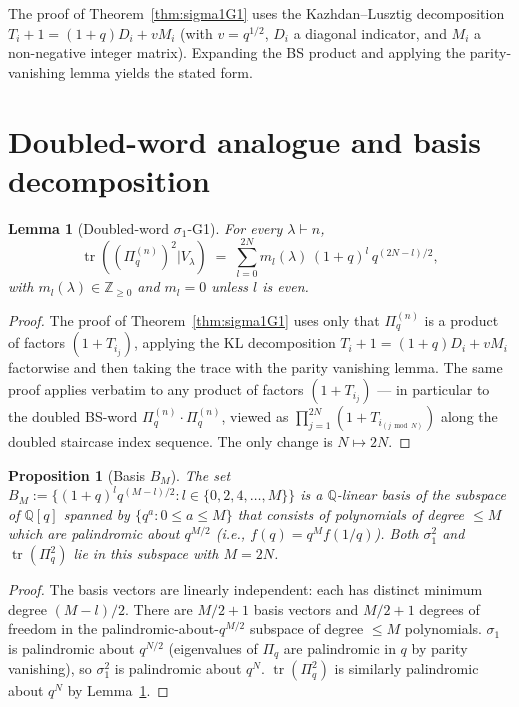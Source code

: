 \documentclass{article}
\newtheorem{lemma}[theorem]{Lemma}
\newtheorem{proposition}[theorem]{Proposition}
\theoremstyle{definition}
\begin{document}
The proof of Theorem~\ref{thm:sigma1G1} uses the Kazhdan--Lusztig decomposition
$T_i + 1 = (1+q)D_i + vM_i$ (with $v = q^{1/2}$, $D_i$ a diagonal indicator,
and $M_i$ a non-negative integer matrix). Expanding the BS product and applying
the parity-vanishing lemma yields the stated form.

\section{Doubled-word analogue and basis decomposition}

\begin{lemma}[Doubled-word $\sigma_1$-G1]\label{lem:doubled}
For every $\lambda \vdash n$,
\[
  \operatorname{tr}((\Pi_q^{(n)})^2 | V_\lambda) \;=\; \sum_{l=0}^{2N} m_l(\lambda)\,(1+q)^l\, q^{(2N-l)/2},
\]
with $m_l(\lambda) \in \mathbb{Z}_{\geq 0}$ and $m_l = 0$ unless $l$ is even.
\end{lemma}

\begin{proof}
The proof of Theorem~\ref{thm:sigma1G1} uses only that $\Pi_q^{(n)}$ is a product of
factors $(1+T_{i_j})$, applying the KL decomposition $T_i+1 = (1+q)D_i + vM_i$
factorwise and then taking the trace with the parity vanishing lemma.
The same proof applies verbatim to any product of factors $(1+T_{i_j})$ — in
particular to the doubled BS-word $\Pi_q^{(n)} \cdot \Pi_q^{(n)}$, viewed as
$\prod_{j=1}^{2N}(1+T_{i_{(j \bmod N)}})$ along the doubled staircase index sequence.
The only change is $N \mapsto 2N$.
\end{proof}

\begin{proposition}[Basis $B_M$]\label{prop:basis}
The set $B_M := \{(1+q)^l q^{(M-l)/2} : l \in \{0, 2, 4, \dots, M\}\}$ is a
$\mathbb{Q}$-linear basis of the subspace of $\mathbb{Q}[q]$ spanned by
$\{q^a : 0 \leq a \leq M\}$ that consists of polynomials of degree $\leq M$
which are palindromic about $q^{M/2}$ (i.e., $f(q) = q^M f(1/q)$). Both
$\sigma_1^2$ and $\operatorname{tr}(\Pi_q^2)$ lie in this subspace with $M = 2N$.
\end{proposition}

\begin{proof}
The basis vectors are linearly independent: each has distinct minimum degree
$(M-l)/2$. There are $M/2 + 1$ basis vectors and $M/2 + 1$ degrees of freedom
in the palindromic-about-$q^{M/2}$ subspace of degree $\leq M$ polynomials.
$\sigma_1$ is palindromic about $q^{N/2}$ (eigenvalues of $\Pi_q$ are palindromic
in $q$ by parity vanishing), so $\sigma_1^2$ is palindromic about $q^N$.
$\operatorname{tr}(\Pi_q^2)$ is similarly palindromic about $q^N$ by Lemma~\ref{lem:doubled}.
\end{proof}
\end{document}
